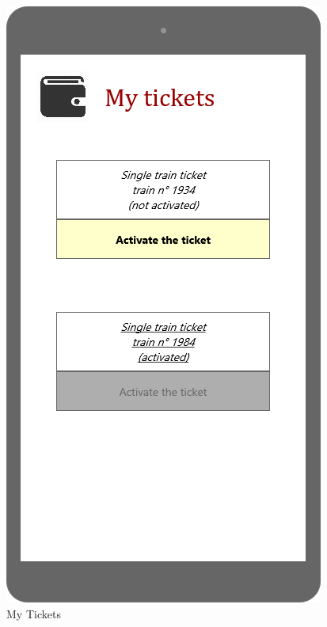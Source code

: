 \documentclass{article}
\begin{document}
\begin{figure}[H]
  \includegraphics[width=\linewidth]{03-Ticket_Wallet.png}
  \caption{My Tickets}\label{fig:MU12}
\endminipage
\end{figure}
\end{document}
